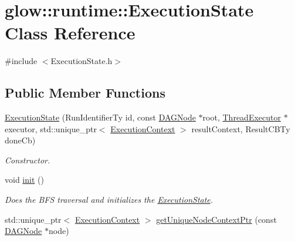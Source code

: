 \hypertarget{classglow_1_1runtime_1_1_execution_state}{}\section{glow\+:\+:runtime\+:\+:Execution\+State Class Reference}
\label{classglow_1_1runtime_1_1_execution_state}


{\ttfamily \#include $<$Execution\+State.\+h$>$}

\subsection*{Public Member Functions}
\begin{DoxyCompactItemize}
\item 
\mbox{\label{classglow_1_1runtime_1_1_execution_state_aff7ae841c3ac20e770aa410bd27d28f4}} 
\hyperlink{classglow_1_1runtime_1_1_execution_state_aff7ae841c3ac20e770aa410bd27d28f4}{Execution\+State} (Run\+Identifier\+Ty id, const \hyperlink{structglow_1_1runtime_1_1_d_a_g_node}{D\+A\+G\+Node} $\ast$root, \hyperlink{classglow_1_1_thread_executor}{Thread\+Executor} $\ast$executor, std\+::unique\+\_\+ptr$<$ \hyperlink{classglow_1_1_execution_context}{Execution\+Context} $>$ result\+Context, Result\+C\+B\+Ty done\+Cb)
\begin{DoxyCompactList}\small\item\em Constructor. \end{DoxyCompactList}\item 
\mbox{\label{classglow_1_1runtime_1_1_execution_state_af83141bff6cd70ed3070139bdd0b2088}} 
void \hyperlink{classglow_1_1runtime_1_1_execution_state_af83141bff6cd70ed3070139bdd0b2088}{init} ()
\begin{DoxyCompactList}\small\item\em Does the B\+FS traversal and initializes the \hyperlink{classglow_1_1runtime_1_1_execution_state}{Execution\+State}. \end{DoxyCompactList}\item 
std\+::unique\+\_\+ptr$<$ \hyperlink{classglow_1_1_execution_context}{Execution\+Context} $>$ \hyperlink{classglow_1_1runtime_1_1_execution_state_a472587e5d655a0cba62586bcc4cefc61}{get\+Unique\+Node\+Context\+Ptr} (const \hyperlink{structglow_1_1runtime_1_1_d_a_g_node}{D\+A\+G\+Node} $\ast$node)

\end{DoxyCompactItemize}
